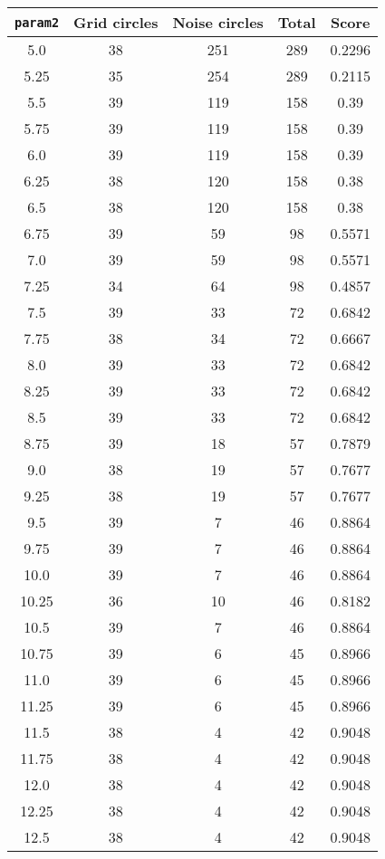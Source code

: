 \documentclass[letterpaper, 12pt]{article}
\begin{document}
\begin{longtable}{|c|c|c|c|c|}
\hline
\textbf{\texttt{param2}} & \textbf{Grid circles} & \textbf{Noise circles} & \textbf{Total} & \textbf{Score} \\
\hline
5.0 & 38 & 251 & 289 & 0.2296 \\
\hline
5.25 & 35 & 254 & 289 & 0.2115 \\
\hline
5.5 & 39 & 119 & 158 & 0.39 \\
\hline
5.75 & 39 & 119 & 158 & 0.39 \\
\hline
6.0 & 39 & 119 & 158 & 0.39 \\
\hline
6.25 & 38 & 120 & 158 & 0.38 \\
\hline
6.5 & 38 & 120 & 158 & 0.38 \\
\hline
6.75 & 39 & 59 & 98 & 0.5571 \\
\hline
7.0 & 39 & 59 & 98 & 0.5571 \\
\hline
7.25 & 34 & 64 & 98 & 0.4857 \\
\hline
7.5 & 39 & 33 & 72 & 0.6842 \\
\hline
7.75 & 38 & 34 & 72 & 0.6667 \\
\hline
8.0 & 39 & 33 & 72 & 0.6842 \\
\hline
8.25 & 39 & 33 & 72 & 0.6842 \\
\hline
8.5 & 39 & 33 & 72 & 0.6842 \\
\hline
8.75 & 39 & 18 & 57 & 0.7879 \\
\hline
9.0 & 38 & 19 & 57 & 0.7677 \\
\hline
9.25 & 38 & 19 & 57 & 0.7677 \\
\hline
9.5 & 39 & 7 & 46 & 0.8864 \\
\hline
9.75 & 39 & 7 & 46 & 0.8864 \\
\hline
10.0 & 39 & 7 & 46 & 0.8864 \\
\hline
10.25 & 36 & 10 & 46 & 0.8182 \\
\hline
10.5 & 39 & 7 & 46 & 0.8864 \\
\hline
10.75 & 39 & 6 & 45 & 0.8966 \\
\hline
11.0 & 39 & 6 & 45 & 0.8966 \\
\hline
11.25 & 39 & 6 & 45 & 0.8966 \\
\hline
11.5 & 38 & 4 & 42 & 0.9048 \\
\hline
11.75 & 38 & 4 & 42 & 0.9048 \\
\hline
12.0 & 38 & 4 & 42 & 0.9048 \\
\hline
12.25 & 38 & 4 & 42 & 0.9048 \\
\hline
12.5 & 38 & 4 & 42 & 0.9048 \\

\end{longtable}
\end{document}
